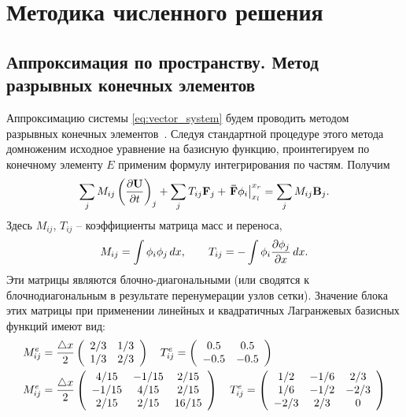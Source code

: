 
\section{Методика численного решения}
\subsection{Аппроксимация по пространству. Метод разрывных конечных элементов}
Аппроксимацию системы 
\cref{eq:vector_system}
будем проводить методом разрывных конечных элементов~\cite{dipietro2012}.
Следуя стандартной процедуре этого метода домноженим
исходное уравнение на базисную функцию,
проинтегируем по конечному элементу $E$
применим формулу интегрирования по частям.
Получим
\begin{equation*}
\sum\limits_j M_{ij} \left(\frac{\partial \boldsymbol{\rm U}}{\partial t}\right)_j 
+ \sum\limits_j T_{ij} \boldsymbol{\rm F}_j + \left.\boldsymbol{\rm \bar F} \phi_i \right|_{x_l}^{x_r}
= 
\sum\limits_j M_{ij} \boldsymbol{\rm B}_j.
\end{equation*}
Здесь $M_{ij}$, $T_{ij}$ -- коэффициенты матрица масс и переноса, 
\begin{equation}
\nonumber
M_{ij} = \int\phi_i\phi_j\, dx,
\qquad
T_{ij} = -\int\phi_i\frac{\partial \phi_j}{\partial x}\, dx.
\end{equation}
Эти матрицы являются блочно-диагональными (или сводятся к блочнодиагональным
в результате перенумерации узлов сетки).
Значение блока этих матрицы при применении линейных и квадратичных
Лагранжевых базисных функций имеют вид:
\begin{align*}
&M^e_{ij} = \frac{\triangle x}{2}\left(\begin{array}{cc}
2/3 & 1/3\\
1/3 & 2/3\\
\end{array}\right)
\quad
T^e_{ij} = \left(\begin{array}{cc}
0.5 & 0.5 \\ -0.5 & -0.5
\end{array}\right)
\\
&M^e_{ij} = \frac{\triangle x}{2}\left(\begin{array}{ccc}
	4 / 15 & -1 / 15 &  2 / 15 \\
	-1 / 15 &  4 / 15 &  2 / 15 \\
	2 / 15 &  2 / 15 & 16 / 15
\end{array}\right)
\quad
T^e_{ij} = \left(\begin{array}{ccc}
1 / 2 & -1 / 6 & 2 / 3\\
1 / 6 & -1 / 2 & -2 / 3\\
-2 / 3 & 2 / 3 & 0
\end{array}\right)
\end{align*}
